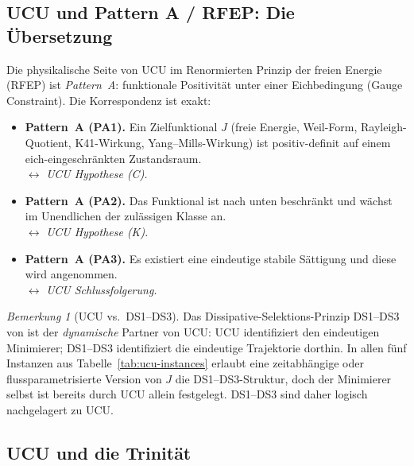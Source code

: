 \documentclass[11pt]{article}
\theoremstyle{definition}
\theoremstyle{remark}
\newtheorem{remark}[theorem]{Bemerkung}
\begin{document}
\renewcommand{\arraystretch}{1.0}

\subsection{UCU und Pattern A / RFEP: Die Übersetzung}
\label{sec:ucu-pattern-a}

Die physikalische Seite von UCU im Renormierten Prinzip der freien Energie (RFEP)
\cite{RFEPFramework} ist \emph{Pattern~A}: funktionale Positivität unter einer
Eichbedingung (Gauge Constraint). Die Korrespondenz ist exakt:

\begin{itemize}
\item \textbf{Pattern~A (PA1).} Ein Zielfunktional $J$ (freie Energie,
Weil-Form, Rayleigh-Quotient, K41-Wirkung, Yang--Mills-Wirkung) ist
positiv-definit auf einem eich-eingeschränkten Zustandsraum.\\
$\longleftrightarrow$ \emph{UCU Hypothese (C).}

\item \textbf{Pattern~A (PA2).} Das Funktional ist nach unten beschränkt
und wächst im Unendlichen der zulässigen Klasse an.\\
$\longleftrightarrow$ \emph{UCU Hypothese (K).}

\item \textbf{Pattern~A (PA3).} Es existiert eine eindeutige stabile Sättigung
und diese wird angenommen.\\
$\longleftrightarrow$ \emph{UCU Schlussfolgerung.}
\end{itemize}

\begin{remark}[UCU vs.\ DS1--DS3]\label{rem:ucu-vs-ds}
Das Dissipative-Selektions-Prinzip DS1--DS3 von
\cite{RFEPFramework} ist der \emph{dynamische} Partner von UCU: UCU
identifiziert den eindeutigen Minimierer; DS1--DS3 identifiziert die eindeutige
Trajektorie dorthin. In allen fünf Instanzen aus
Tabelle~\ref{tab:ucu-instances} erlaubt eine zeitabhängige oder flussparametrisierte
Version von $J$ die DS1--DS3-Struktur, doch der Minimierer
selbst ist bereits durch UCU allein festgelegt. DS1--DS3 sind daher
logisch nachgelagert zu UCU.
\end{remark}

\subsection{UCU und die Trinität}
\label{sec:ucu-trinity}
\end{document}
